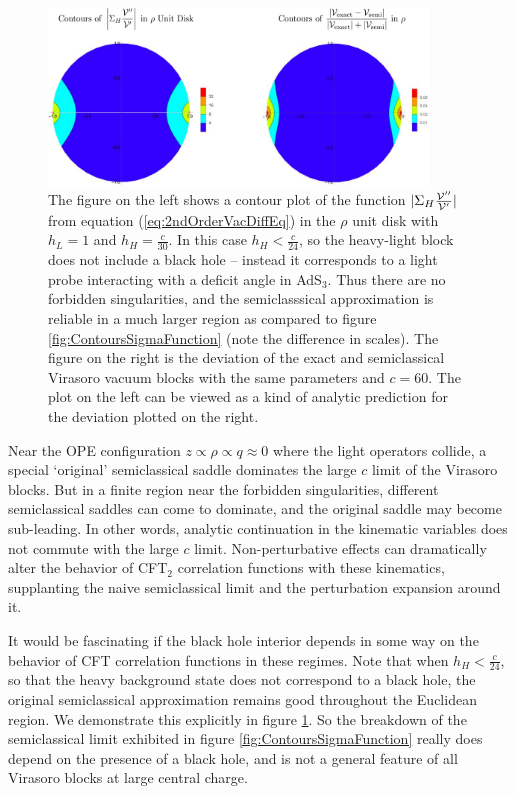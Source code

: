 \begin{figure}
\centering{}\includegraphics[width=0.9\textwidth]{virasoro_chapter/NoBHContours}
\caption[Contour plots in the $\rho$ disk of deviations from semiclassical predictions]{The figure on the left shows a contour plot of the function $|\Sigma_{H} \frac{{\cal V}''}{{\cal V}'}|$ from equation (\ref{eq:2ndOrderVacDiffEq}) in the $\rho$ unit disk with $h_L = 1$ and $h_H = \frac{c}{30}$.  In this case $h_H < \frac{c}{24}$, so the heavy-light block does not include a black hole -- instead it corresponds to a light probe interacting with a deficit angle in AdS$_3$.  Thus there are no forbidden singularities, and the semiclasssical approximation is reliable in a much larger region as compared to figure \ref{fig:ContoursSigmaFunction} (note the difference in scales).  The figure on the right is the deviation of the exact and semiclassical Virasoro vacuum blocks with the same parameters and $c = 60$.  The plot on the left can be viewed as a kind of analytic prediction for the deviation plotted on the right. }
\label{fig:NoBHContours}
\end{figure}

Near the OPE configuration $z \propto \rho \propto q \approx 0$ where the light operators collide, a special `original' semiclassical saddle dominates the large $c$ limit \cite{Fitzpatrick:2016ive} of the Virasoro blocks.  But in a finite region near the forbidden singularities, different semiclassical saddles \cite{Fitzpatrick:2016mjq} can come to dominate, and the original saddle may become sub-leading.  In other words, analytic continuation in the kinematic variables does not commute with the large $c$ limit.  Non-perturbative effects can dramatically alter the behavior of CFT$_2$ correlation functions with these kinematics, supplanting the naive semiclassical limit and the perturbation expansion around it.  

It would be fascinating if the black hole interior depends in some way on the behavior of CFT correlation functions in these regimes.  Note that when $h_H < \frac{c}{24}$, so that the heavy background state does not correspond to a black hole, the original semiclassical approximation remains good throughout the Euclidean region. We demonstrate this explicitly in figure \ref{fig:NoBHContours}.  So the breakdown of the semiclassical limit exhibited in figure \ref{fig:ContoursSigmaFunction} really does depend on the presence of a black hole, and is not a general feature of all Virasoro blocks at large central charge.



